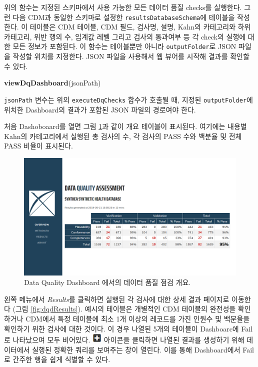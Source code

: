 \documentclass[11pt]{book}
\newenvironment{Shaded}{\begin{snugshade}}{\end{snugshade}}
\newcommand{\KeywordTok}[1]{\textcolor[rgb]{0.13,0.29,0.53}{\textbf{#1}}}
\newcommand{\NormalTok}[1]{#1}
\theoremstyle{definition}
\theoremstyle{definition}
\theoremstyle{definition}
\theoremstyle{remark}
\begin{document}
위의 함수는 지정된 스키마에서 사용 가능한 모든 데이터 품질 checks를
실행한다. 그런 다음 CDM과 동일한 스키마로 설정한
\texttt{resultsDatabaseSchema}에 테이블을 작성한다. 이 테이블은 CDM
테이블, CDM 필드, 검사명, 설명, Kahn의 카테고리와 하위 카테고리, 위반
행의 수, 임계값 레벨 그리고 검사의 통과여부 등 각 check의 실행에 대한
모든 정보가 포함된다. 이 함수는 테이블뿐만 아니라
\texttt{outputFolder}로 JSON 파일을 작성할 위치를 지정한다. JSON 파일을
사용해서 웹 뷰어를 시작해 결과를 확인할 수 있다.

\begin{Shaded}
\begin{Highlighting}[]
\KeywordTok{viewDqDashboard}\NormalTok{(jsonPath)}
\end{Highlighting}
\end{Shaded}

\texttt{jsonPath} 변수는 위의 \texttt{executeDqChecks} 함수가 호출될 때,
지정된 \texttt{outputFolder}에 위치한 Dashboard의 결과가 포함된 JSON
파일의 경로여야 한다.

처음 Dashoboaard를 열면 그림 \ref{fig:dqdOverview}과 같이 개요 테이블이
표시된다. 여기에는 내용별 Kahn의 카테고리에서 실행된 총 검사의 수, 각
검사의 PASS 수와 백분율 및 전체 PASS 비율이 표시된다.

\begin{figure}

{\centering \includegraphics[width=1\linewidth]{images/DataQuality/dqdOverview} 

}

\caption{Data Quality Dashboard 에서의 데이터 품질 점검 개요.}\label{fig:dqdOverview}
\end{figure}

왼쪽 메뉴에서 \emph{Results}를 클릭하면 실행된 각 검사에 대한 상세 결과
페이지로 이동한다 (그림 \ref{fig:dqdResults}). 예시의 테이블은 개별적인
CDM 테이블의 완전성을 확인하거나 CDM에서 특정 테이블에 최소 1개 이상의
레코드를 가진 인원수 및 백분율을 확인하기 위한 검사에 대한 것이다. 이
경우 나열된 5개의 테이블이 Dashboarc에 Fail로 나타났으며 모두 비어있다.
\includegraphics{images/DataQuality/plusIcon.png} 아이콘을 클릭하면
나열된 결과를 생성하기 위해 데이터에서 실행된 정확한 쿼리를 보여주는
창이 열린다. 이를 통해 Dashboard에서 Fail로 간주한 행을 쉽게 식별할 수
있다.
\end{document}
